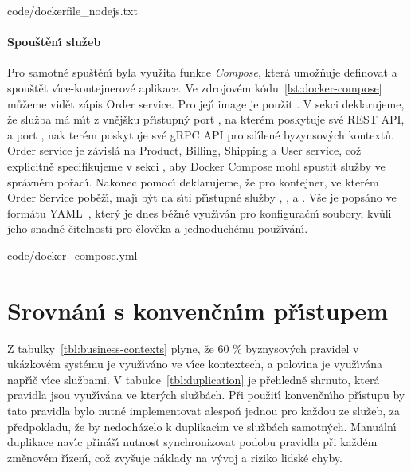 
{code/dockerfile_nodejs.txt}

\paragraph{Spouštěn\'{\i} služeb}
Pro samotné spuštěn\'{\i} byla využita funkce \textit{Compose}, která umožňuje
definovat a spouštět v\'{\i}ce-kontejnerové aplikace. Ve zdrojovém kódu~\ref{lst:docker-compose}
můžeme vidět zápis Order service. Pro jej\'{\i} image je použit .
V sekci  deklarujeme, že služba má m\'{\i}t z vnějšku př\'{\i}stupn\'y port , na kterém poskytuje své
\gls{REST} \gls{API}, a port , nak terém poskytuje své gRPC \gls{API} pro sd\'{\i}lené byzynsov\'ych kontextů. Order service je závislá
na Product, Billing, Shipping a User service, což explicitně specifikujeme v sekci ,
aby Docker Compose mohl spustit služby ve správném pořad\'{\i}. Nakonec pomoc\'{\i}  deklarujeme,
že pro kontejner, ve kterém Order Service poběž\'{\i}, maj\'{\i} b\'yt na s\'{\i}ti př\'{\i}stupné služby , ,
 a . Vše je popsáno ve formátu \gls{YAML}~\cite{ben2005yaml}, kter\'y je dnes běžně využ\'{\i}ván
pro konfiguračn\'{\i} soubory, kvůli jeho snadné čitelnosti pro člověka a jednoduchému použ\'{\i}ván\'{\i}.


{code/docker_compose.yml}

\section{Srovnán\'{\i} s konvenčn\'{\i}m př\'{\i}stupem}

Z tabulky~\ref{tbl:business-contexts} plyne, že 60 \% byznysov\'ych pravidel v ukázkovém systému je
využ\'{\i}váno ve v\'{\i}ce kontextech, a polovina je využ\'{\i}vána např\'{\i}č v\'{\i}ce službami.
V tabulce~\ref{tbl:duplication} je přehledně shrnuto, která pravidla jsou využ\'{\i}vána ve kter\'ych službách.
Při použit\'{\i} konvenčn\'{\i}ho př\'{\i}stupu by tato pravidla bylo nutné implementovat alespoň
jednou pro každou ze služeb, za předpokladu, že by nedocházelo k duplikac\'{\i}m ve službách samotn\'ych.
Manuáln\'{\i} duplikace nav\'{\i}c přináš\'{\i} nutnost synchronizovat podobu pravidla při každém změnovém
ř\'{\i}zen\'{\i}, což zvyšuje náklady na v\'yvoj a riziko lidské chyby.

